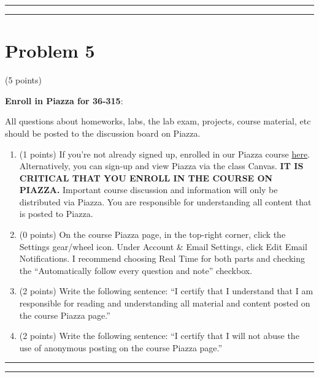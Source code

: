 \documentclass[]{article}
\begin{document}
\begin{center}\rule{0.5\linewidth}{\linethickness}\end{center}

\begin{center}\rule{0.5\linewidth}{\linethickness}\end{center}

\hypertarget{problem-5}{%
\section{Problem 5}\label{problem-5}}

(5 points)

\textbf{Enroll in Piazza for 36-315}:

All questions about homeworks, labs, the lab exam, projects, course
material, etc should be posted to the discussion board on Piazza.

\begin{enumerate}
\def\labelenumi{\alph{enumi}.}
\item
  (1 points) If you're not already signed up, enrolled in our Piazza
  course \href{https://piazza.com/cmu/fall2018/36315}{here}.
  Alternatively, you can sign-up and view Piazza via the class Canvas.
  \textbf{IT IS CRITICAL THAT YOU ENROLL IN THE COURSE ON PIAZZA.}
  Important course discussion and information will only be distributed
  via Piazza. You are responsible for understanding all content that is
  posted to Piazza.
\item
  (0 points) On the course Piazza page, in the top-right corner, click
  the Settings gear/wheel icon. Under Account \& Email Settings, click
  Edit Email Notifications. I recommend choosing Real Time for both
  parts and checking the ``Automatically follow every question and
  note'' checkbox.
\item
  (2 points) Write the following sentence: ``I certify that I understand
  that I am responsible for reading and understanding all material and
  content posted on the course Piazza page.''
\item
  (2 points) Write the following sentence: ``I certify that I will not
  abuse the use of anonymous posting on the course Piazza page.''
\end{enumerate}

\begin{center}\rule{0.5\linewidth}{\linethickness}\end{center}

\begin{center}\rule{0.5\linewidth}{\linethickness}\end{center}
\end{document}
